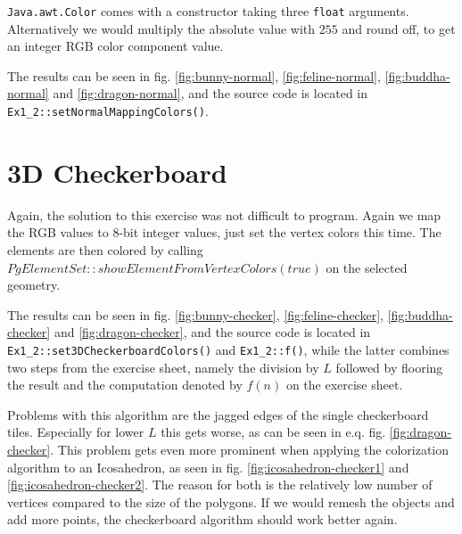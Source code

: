 \documentclass[a4paper,10pt,notitlepage]{scrreprt}
\begin{document}
\texttt{Java.awt.Color} comes with a constructor taking three \texttt{float}
arguments. Alternatively we would multiply the absolute value with $255$ and
round off, to get an integer RGB color component value.

The results can be seen in fig. \ref{fig:bunny-normal},
\ref{fig:feline-normal}, \ref{fig:buddha-normal} and \ref{fig:dragon-normal},
and the source code is located in \texttt{Ex1\_2::setNormalMappingColors()}.

\section{3D Checkerboard}

Again, the solution to this exercise was not difficult to program. Again we map
the RGB values to $8$-bit integer values, just set the vertex colors this time.
The elements are then colored by
calling $PgElementSet::showElementFromVertexColors(true)$ on the selected
geometry.

The results can be seen in fig. \ref{fig:bunny-checker},
\ref{fig:feline-checker}, \ref{fig:buddha-checker} and
\ref{fig:dragon-checker},
and the source code is located in \texttt{Ex1\_2::set3DCheckerboardColors()}
and \texttt{Ex1\_2::f()}, while the latter combines two steps from the exercise
sheet, namely the division by $L$ followed by flooring the result and the
computation denoted by $f(n)$ on the exercise sheet.

Problems with this algorithm are the jagged edges of the single checkerboard
tiles. Especially for lower $L$ this gets worse, as can be seen in e.q. fig.
\ref{fig:dragon-checker}. This problem gets even more prominent when applying
the colorization algorithm to an Icosahedron, as seen in fig.
\ref{fig:icosahedron-checker1} and \ref{fig:icosahedron-checker2}. The reason
for both is the relatively low number of vertices compared to the size of the
polygons. If we would remesh the objects and add more points, the checkerboard
algorithm should work better again.
\end{document}
